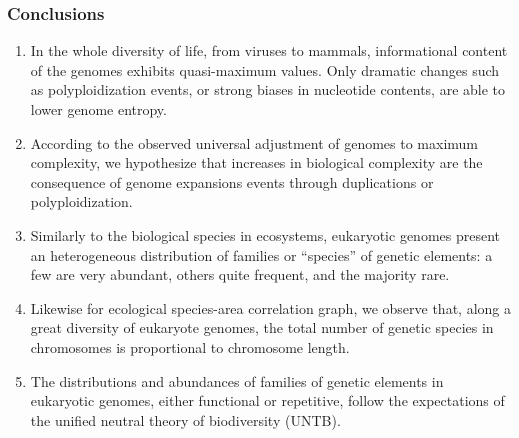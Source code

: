 \documentclass[hyperref={pagebackref=true},table]{beamer}
\begin{document}
\begin{frame}
  \frametitle{Conclusions}
  \begin{enumerate}
    \scriptsize
    \setlength{\itemsep}{10pt}
    \setlength{\parskip}{0pt}
    \setlength{\parsep}{0pt}

\item In the whole diversity of life, from viruses to mammals, informational content of the genomes exhibits quasi-maximum values. Only dramatic changes such as polyploidization events, or strong biases in nucleotide contents, are able to lower genome entropy.
\item According to the observed universal adjustment of genomes to maximum complexity, we hypothesize that increases in biological complexity are the consequence of genome expansions events through duplications or polyploidization.
\item Similarly to the biological species in ecosystems, eukaryotic genomes present an heterogeneous distribution of families or ``species'' of genetic elements: a few are very abundant, others quite frequent, and the majority rare.
\item  Likewise for ecological species-area correlation graph, we observe that, along a great diversity of eukaryote genomes, the total number of genetic species in chromosomes is proportional to chromosome length.
\item The distributions and abundances of families of genetic elements in eukaryotic genomes, either functional or repetitive, follow the expectations of the unified neutral theory of biodiversity (UNTB).
\end{enumerate}
\end{frame}

\end{document}
